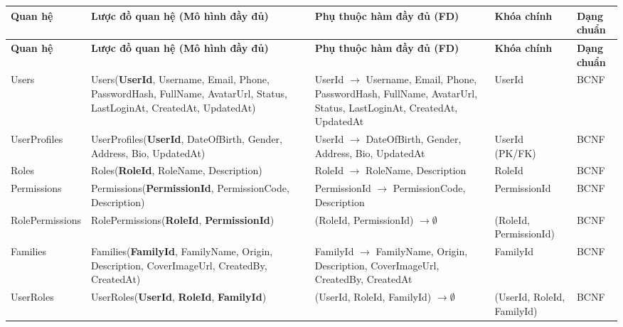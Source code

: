 \vspace{0.8em}
\begingroup
\footnotesize
\renewcommand{\arraystretch}{1.3}
\setlength{\tabcolsep}{2.5pt}
\begin{longtable}{|>{\raggedright\arraybackslash}p{}
		|>{\raggedright\arraybackslash}p{}
		|>{\raggedright\arraybackslash}p{}
		|>{\raggedright\arraybackslash}p{}
		|>{\centering\arraybackslash}p{}|}
	\hline
	\textbf{Quan hệ} & \textbf{Lược đồ quan hệ (Mô hình đầy đủ)} & \textbf{Phụ thuộc hàm đầy đủ (FD)} & \textbf{Khóa chính} & \textbf{Dạng chuẩn} \\ \hline
	\endfirsthead
	\hline
	\textbf{Quan hệ} & \textbf{Lược đồ quan hệ (Mô hình đầy đủ)} & \textbf{Phụ thuộc hàm đầy đủ (FD)} & \textbf{Khóa chính} & \textbf{Dạng chuẩn} \\ \hline
	\endhead
	
	Users & Users(\textbf{UserId}, Username, Email, Phone, PasswordHash, FullName, AvatarUrl, Status, LastLoginAt, CreatedAt, UpdatedAt) & UserId $\rightarrow$ Username, Email, Phone, PasswordHash, FullName, AvatarUrl, Status, LastLoginAt, CreatedAt, UpdatedAt & UserId & BCNF \\ \hline
	
	UserProfiles & UserProfiles(\textbf{UserId}, DateOfBirth, Gender, Address, Bio, UpdatedAt) & UserId $\rightarrow$ DateOfBirth, Gender, Address, Bio, UpdatedAt & UserId (PK/FK) & BCNF \\ \hline
	
	Roles & Roles(\textbf{RoleId}, RoleName, Description) & RoleId $\rightarrow$ RoleName, Description & RoleId & BCNF \\ \hline
	
	Permissions & Permissions(\textbf{PermissionId}, PermissionCode, Description) & PermissionId $\rightarrow$ PermissionCode, Description & PermissionId & BCNF \\ \hline
	
	RolePermissions & RolePermissions(\textbf{RoleId}, \textbf{PermissionId}) & (RoleId, PermissionId) $\rightarrow \emptyset$ & (RoleId, PermissionId) & BCNF \\ \hline
	
	Families & Families(\textbf{FamilyId}, FamilyName, Origin, Description, CoverImageUrl, CreatedBy, CreatedAt) & FamilyId $\rightarrow$ FamilyName, Origin, Description, CoverImageUrl, CreatedBy, CreatedAt & FamilyId & BCNF \\ \hline
	
	UserRoles & UserRoles(\textbf{UserId}, \textbf{RoleId}, \textbf{FamilyId}) & (UserId, RoleId, FamilyId) $\rightarrow \emptyset$ & (UserId, RoleId, FamilyId) & BCNF \\ \hline
	

\end{longtable}
